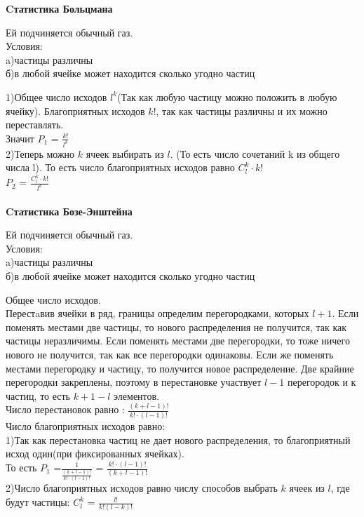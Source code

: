 \documentclass[russian, 12pt, fleqn]{article}
\begin{document}
\textbf{Cтатистика Больцмана}
\begin{tabbing}
Ей подчиняется обычный газ.\\
Условия:\\
\qquad a)частицы различны\\
\qquad б)в любой ячейке может находится сколько угодно частиц\\
\end{tabbing}
1)Общее число исходов $l^k$(Так как любую частицу можно положить в любую ячейку). Благоприятных исходов $k!$, так как частицы различны и их можно переставлять.\\
Значит $P_1$ = $\frac{k!}{l^k}$\\
2)Теперь можно $k$ ячеек выбирать из $l$. (То есть число сочетаний k из общего числа l). То есть число благоприятных исходов равно $C^k_l \cdot k!$\\
$P_2$ = $\frac{C_l^k\cdot k!}{l^k}$\\
\\
\textbf{Cтатистика Бозе-Энштейна}
\begin{tabbing}
Ей подчиняется обычный газ.\\
Условия:\\
\qquad a)частицы различны\\
\qquad б)в любой ячейке может находится сколько угодно частиц\\
\end{tabbing}
Общее число исходов.\\
Перестaвив ячейки в ряд, границы определим перегородками, которых $l + 1$. Если поменять местами две частицы, то нового распределения не получится, так как частицы неразличимы. Если поменять местами две перегородки, то тоже ничего нового не получится, так как все перегородки одинаковы. Если же поменять местами перегородку и частицу, то получится новое распределение. Две крайние перегородки закреплены, поэтому в перестановке участвует $ l - 1$ перегородок и к частиц, то есть  $k + 1 - l$ элементов.\\
Число перестановок равно : $\frac{(k + l - 1)!}{k!\cdot (l - 1)!}$\\
Число благоприятных исходов равно:\\
1)Так как перестановка частиц не дает нового распределения, то благоприятный исход один(при фиксированных ячейках).\\
То есть $P_1$ =$\frac{1}{\frac{(k + l - 1)!}{k!\cdot(l-1)!}}$ = $\frac{k!\cdot(l-1)!}{(k + l - 1)!}$\\
2)Число благоприятных исходов равно числу способов выбрать $k$ ячеек из $l$, где будут частицы: $C^k_l$ = $\frac{l!}{k!(l - k)!}$\\
\end{document}
